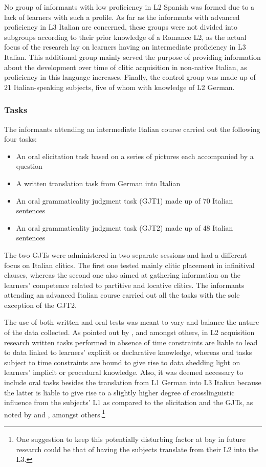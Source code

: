 \documentclass[output=paper,modfonts,nonflat,newtxmath]{langsci/langscibook}
\begin{document}
No group of informants with low proficiency in L2 Spanish was formed due to a lack of learners with such a profile. As far as the informants with advanced proficiency in L3 Italian are concerned, these groups were not divided into subgroups according to their prior knowledge of a Romance L2, as the actual focus of the research lay on learners having an intermediate proficiency in L3 Italian. This additional group mainly served the purpose of providing information about the development over time of clitic acquisition in non-native Italian, as proficiency in this language increases. Finally, the control group was made up of 21 Italian-speaking subjects, five of whom with knowledge of L2 German.

\subsubsection{Tasks} %

The informants attending an intermediate Italian course carried out the following four tasks:

\begin{itemize}
\item An oral elicitation task based on a series of pictures each accompanied by a question
\item A written translation task from German into Italian
\item An oral grammaticality judgment task (GJT1) made up of 70 Italian sentences
\item An oral grammaticality judgment task (GJT2) made up of 48 Italian sentences
\end{itemize}

The two GJTs were administered in two separate sessions and had a different focus on Italian clitics. The first one tested mainly clitic placement in infinitival clauses, whereas the second one also aimed at gathering information on the learners’ competence related to partitive and locative clitics. The informants attending an advanced Italian course carried out all the tasks with the sole exception of the GJT2.

The use of both written and oral tests was meant to vary and balance the nature of the data collected. As pointed out by \citet{BialystokRyan1985}, \citet{Montrul2009} and \citet{EllisR2005} amongst others, in L2 acquisition research written tasks performed in absence of time constraints are liable to lead to data linked to learners’ explicit or declarative knowledge, whereas oral tasks subject to time constraints are bound to give rise to data shedding light on learners’ implicit or procedural knowledge. Also, it was deemed necessary to include oral tasks besides the translation from L1 German into L3 Italian because the latter is liable to give rise to a slightly higher degree of crosslinguistic influence from the subjects’ L1 as compared to the elicitation and the GJTs, as noted by \citet{BennatiDiDomenico2008} and \citet{Tytus2019}, amongst others.\footnote{One suggestion to keep this potentially disturbing factor at bay in future research could be that of having the subjects translate from their L2 into the L3.}
\end{document}

